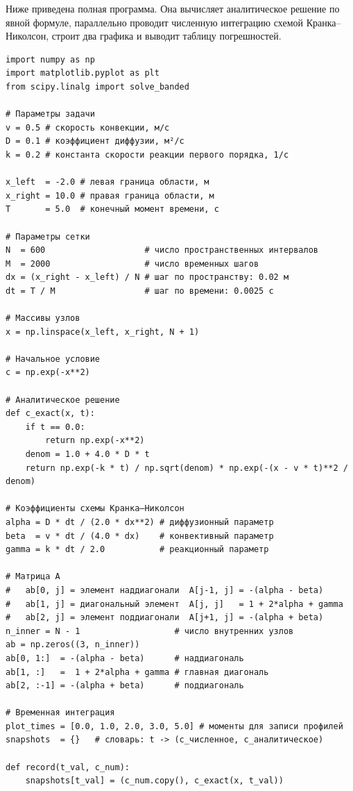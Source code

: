 
        Ниже приведена полная программа.
        Она вычисляет аналитическое решение по явной формуле,
        параллельно проводит численную интеграцию схемой Кранка--Николсон,
        строит два графика и выводит таблицу погрешностей.

\begin{verbatim}
import numpy as np
import matplotlib.pyplot as plt
from scipy.linalg import solve_banded

# Параметры задачи
v = 0.5 # скорость конвекции, м/с
D = 0.1 # коэффициент диффузии, м²/с
k = 0.2 # константа скорости реакции первого порядка, 1/с

x_left  = -2.0 # левая граница области, м
x_right = 10.0 # правая граница области, м
T       = 5.0  # конечный момент времени, с

# Параметры сетки
N  = 600                    # число пространственных интервалов
M  = 2000                   # число временных шагов
dx = (x_right - x_left) / N # шаг по пространству: 0.02 м
dt = T / M                  # шаг по времени: 0.0025 с

# Массивы узлов
x = np.linspace(x_left, x_right, N + 1)

# Начальное условие
c = np.exp(-x**2)

# Аналитическое решение
def c_exact(x, t):
    if t == 0.0:
        return np.exp(-x**2)
    denom = 1.0 + 4.0 * D * t
    return np.exp(-k * t) / np.sqrt(denom) * np.exp(-(x - v * t)**2 / denom)

# Коэффициенты схемы Кранка–Николсон
alpha = D * dt / (2.0 * dx**2) # диффузионный параметр
beta  = v * dt / (4.0 * dx)    # конвективный параметр
gamma = k * dt / 2.0           # реакционный параметр

# Матрица A
#   ab[0, j] = элемент наддиагонали  A[j-1, j] = -(alpha - beta)
#   ab[1, j] = диагональный элемент  A[j, j]   = 1 + 2*alpha + gamma
#   ab[2, j] = элемент поддиагонали  A[j+1, j] = -(alpha + beta)
n_inner = N - 1                   # число внутренних узлов
ab = np.zeros((3, n_inner))
ab[0, 1:]  = -(alpha - beta)      # наддиагональ
ab[1, :]   =  1 + 2*alpha + gamma # главная диагональ
ab[2, :-1] = -(alpha + beta)      # поддиагональ

# Временная интеграция
plot_times = [0.0, 1.0, 2.0, 3.0, 5.0] # моменты для записи профилей
snapshots  = {}   # словарь: t -> (c_численное, c_аналитическое)

def record(t_val, c_num):
    snapshots[t_val] = (c_num.copy(), c_exact(x, t_val))


\end{verbatim}
